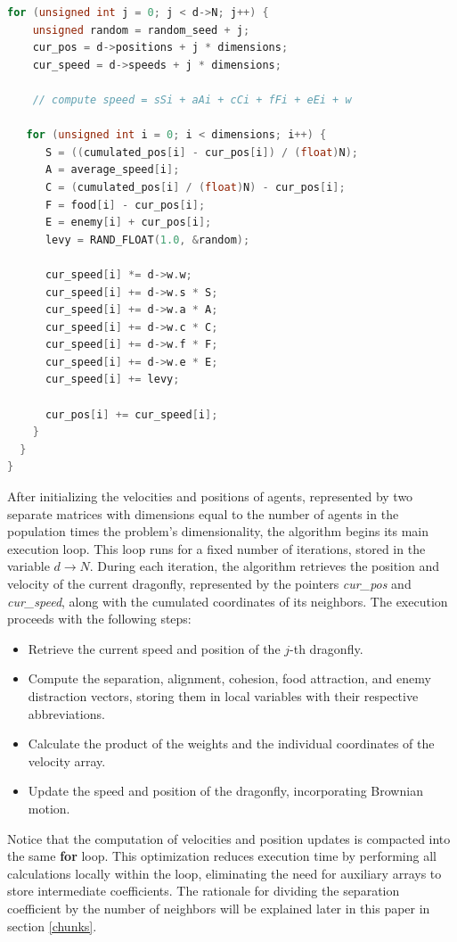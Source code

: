 \documentclass[10pt]{article}
\begin{document}
\begin{multicols}{2}
\begin{lstlisting}[language=C,caption={first implementation of the dragonfly algorithm}]
  for (unsigned int j = 0; j < d->N; j++) {
    unsigned random = random_seed + j;
    cur_pos = d->positions + j * dimensions;
    cur_speed = d->speeds + j * dimensions;

    // compute speed = sSi + aAi + cCi + fFi + eEi + w

   for (unsigned int i = 0; i < dimensions; i++) {
      S = ((cumulated_pos[i] - cur_pos[i]) / (float)N);
      A = average_speed[i];
      C = (cumulated_pos[i] / (float)N) - cur_pos[i];
      F = food[i] - cur_pos[i];
      E = enemy[i] + cur_pos[i];
      levy = RAND_FLOAT(1.0, &random);

      cur_speed[i] *= d->w.w;
      cur_speed[i] += d->w.s * S;
      cur_speed[i] += d->w.a * A;
      cur_speed[i] += d->w.c * C;
      cur_speed[i] += d->w.f * F;
      cur_speed[i] += d->w.e * E;
      cur_speed[i] += levy;

      cur_pos[i] += cur_speed[i];
    }
  }
}
\end{lstlisting}

\noindent After initializing the velocities and positions of agents,
represented by two separate matrices with dimensions equal to the number of agents in the population times the problem's dimensionality, the algorithm begins its main execution loop.
This loop runs for a fixed number of iterations, stored in the variable $d\rightarrow N$.
During each iteration, the algorithm retrieves the position and velocity of the current dragonfly, represented by the pointers \textit{cur\_pos} and \textit{cur\_speed}, along with the cumulated coordinates of its neighbors.
The execution proceeds with the following steps:

\begin{itemize}
  \item Retrieve the current speed and position of the $j$-th dragonfly.
  \item Compute the separation, alignment, cohesion, food attraction, and enemy distraction vectors, storing them in local variables with their respective abbreviations.
  \item Calculate the product of the weights and the individual coordinates of the velocity array.
  \item Update the speed and position of the dragonfly, incorporating Brownian motion.
\end{itemize}

\noindent Notice that the computation of velocities and position updates is compacted into the same \textbf{for} loop.
This optimization reduces execution time by performing all calculations locally within the loop, eliminating the need for auxiliary arrays to store intermediate coefficients.
The rationale for dividing the separation coefficient by the number of neighbors will be explained later in this paper in section \ref{chunks}.


\end{multicols}
\end{document}
